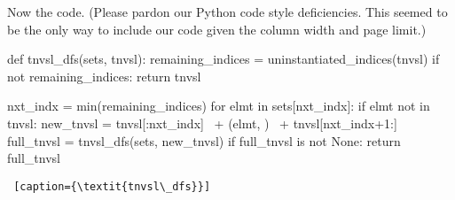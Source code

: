 Now the code. (Please pardon our Python code style deficiencies. This seemed to be the only way to include our code given the column width and page limit.)


\begin{minipage}[c]{0.45\textwidth}
\begin{python1}  
def tnvsl_dfs(sets, tnvsl):
  remaining_indices = uninstantiated_indices(tnvsl)
  if not remaining_indices: return tnvsl

  nxt_indx = min(remaining_indices)
  for elmt in sets[nxt_indx]:
    if elmt not in tnvsl:
      new_tnvsl = tnvsl[:nxt_indx] \
                  + (elmt, ) \
                  + tnvsl[nxt_indx+1:]
      full_tnvsl = tnvsl_dfs(sets, new_tnvsl)
      if full_tnvsl is not None: return full_tnvsl
\end{python1}\linv
\begin{lstlisting} [caption={\textit{tnvsl\_dfs}}]
\end{lstlisting}
\end{minipage}


